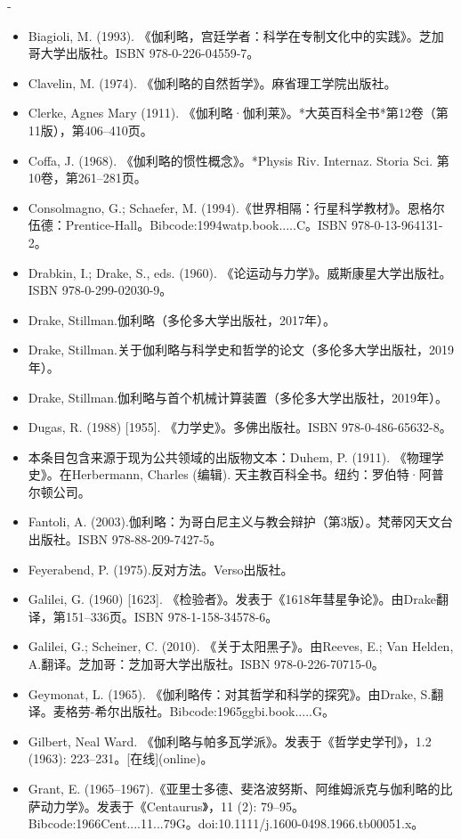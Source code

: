 -\begin{itemize}
\item Biagioli, M. (1993). 《伽利略，宫廷学者：科学在专制文化中的实践》。芝加哥大学出版社。ISBN 978-0-226-04559-7。
\item Clavelin, M. (1974). 《伽利略的自然哲学》。麻省理工学院出版社。
\item Clerke, Agnes Mary (1911). 《伽利略·伽利莱》。*大英百科全书*第12卷（第11版），第406–410页。
\item Coffa, J. (1968). 《伽利略的惯性概念》。*Physis Riv. Internaz. Storia Sci. 第10卷，第261–281页。
\item Consolmagno, G.; Schaefer, M. (1994).《世界相隔：行星科学教材》。恩格尔伍德：Prentice-Hall。Bibcode:1994watp.book.....C。ISBN 978-0-13-964131-2。
\item Drabkin, I.; Drake, S., eds. (1960). 《论运动与力学》。威斯康星大学出版社。ISBN 978-0-299-02030-9。
\item Drake, Stillman.伽利略（多伦多大学出版社，2017年）。
\item Drake, Stillman.关于伽利略与科学史和哲学的论文（多伦多大学出版社，2019年）。
\item Drake, Stillman.伽利略与首个机械计算装置（多伦多大学出版社，2019年）。
\item Dugas, R. (1988) [1955]. 《力学史》。多佛出版社。ISBN 978-0-486-65632-8。
\item 本条目包含来源于现为公共领域的出版物文本：Duhem, P. (1911). 《物理学史》。在Herbermann, Charles (编辑). 天主教百科全书。纽约：罗伯特·阿普尔顿公司。
\item Fantoli, A. (2003).伽利略：为哥白尼主义与教会辩护（第3版）。梵蒂冈天文台出版社。ISBN 978-88-209-7427-5。  
\item Feyerabend, P. (1975).反对方法。Verso出版社。
\item Galilei, G. (1960) [1623]. 《检验者》。发表于《1618年彗星争论》。由Drake翻译，第151–336页。ISBN 978-1-158-34578-6。  
\item Galilei, G.; Scheiner, C. (2010). 《关于太阳黑子》。由Reeves, E.; Van Helden, A.翻译。芝加哥：芝加哥大学出版社。ISBN 978-0-226-70715-0。  
\item Geymonat, L. (1965). 《伽利略传：对其哲学和科学的探究》。由Drake, S.翻译。麦格劳-希尔出版社。Bibcode:1965ggbi.book.....G。  
\item Gilbert, Neal Ward. 《伽利略与帕多瓦学派》。发表于《哲学史学刊》，1.2 (1963): 223–231。[在线](online)。  
\item Grant, E. (1965–1967).《亚里士多德、斐洛波努斯、阿维姆派克与伽利略的比萨动力学》。发表于《Centaurus》，11 (2): 79–95。Bibcode:1966Cent....11...79G。doi:10.1111/j.1600-0498.1966.tb00051.x。  

\end{itemize}
